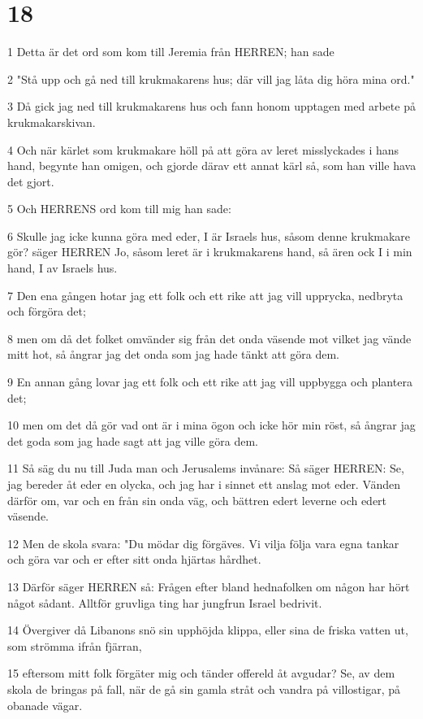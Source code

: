 \chapter{18}

\par 1 Detta är det ord som kom till Jeremia från HERREN; han sade
\par 2 "Stå upp och gå ned till krukmakarens hus; där vill jag låta dig höra mina ord."
\par 3 Då gick jag ned till krukmakarens hus och fann honom upptagen med arbete på krukmakarskivan.
\par 4 Och när kärlet som krukmakare höll på att göra av leret misslyckades i hans hand, begynte han omigen, och gjorde därav ett annat kärl så, som han ville hava det gjort.
\par 5 Och HERRENS ord kom till mig han sade:
\par 6 Skulle jag icke kunna göra med eder, I är Israels hus, såsom denne krukmakare gör? säger HERREN Jo, såsom leret är i krukmakarens hand, så ären ock I i min hand, I av Israels hus.
\par 7 Den ena gången hotar jag ett folk och ett rike att jag vill upprycka, nedbryta och förgöra det;
\par 8 men om då det folket omvänder sig från det onda väsende mot vilket jag vände mitt hot, så ångrar jag det onda som jag hade tänkt att göra dem.
\par 9 En annan gång lovar jag ett folk och ett rike att jag vill uppbygga och plantera det;
\par 10 men om det då gör vad ont är i mina ögon och icke hör min röst, så ångrar jag det goda som jag hade sagt att jag ville göra dem.
\par 11 Så säg du nu till Juda man och Jerusalems invånare: Så säger HERREN: Se, jag bereder åt eder en olycka, och jag har i sinnet ett anslag mot eder. Vänden därför om, var och en från sin onda väg, och bättren edert leverne och edert väsende.
\par 12 Men de skola svara: "Du mödar dig förgäves. Vi vilja följa vara egna tankar och göra var och er efter sitt onda hjärtas hårdhet.
\par 13 Därför säger HERREN så: Frågen efter bland hednafolken om någon har hört något sådant. Alltför gruvliga ting har jungfrun Israel bedrivit.
\par 14 Övergiver då Libanons snö sin upphöjda klippa, eller sina de friska vatten ut, som strömma ifrån fjärran,
\par 15 eftersom mitt folk förgäter mig och tänder offereld åt avgudar? Se, av dem skola de bringas på fall, när de gå sin gamla stråt och vandra på villostigar, på obanade vägar.
